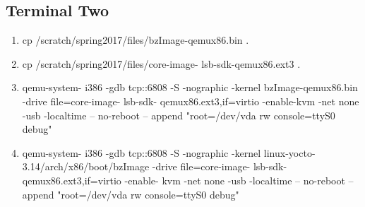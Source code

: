 \documentclass[letterpaper,10pt,draftclsnofoot,onecolumn]{IEEEtran}
\begin{document}
\subsection{Terminal Two}
\begin{enumerate}
\item cp /scratch/spring2017/files/bzImage-qemux86.bin .
\item cp /scratch/spring2017/files/core-image- lsb-sdk-qemux86.ext3 .
\item qemu-system- i386 -gdb tcp::6808 -S -nographic -kernel bzImage-qemux86.bin -drive file=core-image- lsb-sdk- qemux86.ext3,if=virtio -enable-kvm -net none -usb -localtime -- no-reboot -- append "root=/dev/vda rw console=ttyS0 debug"
\item qemu-system- i386 -gdb tcp::6808 -S -nographic -kernel linux-yocto- 3.14/arch/x86/boot/bzImage  -drive file=core-image- lsb-sdk- qemux86.ext3,if=virtio -enable- kvm -net none -usb -localtime -- no-reboot -- append "root=/dev/vda rw console=ttyS0 debug"
\end{enumerate}
\end{document}
